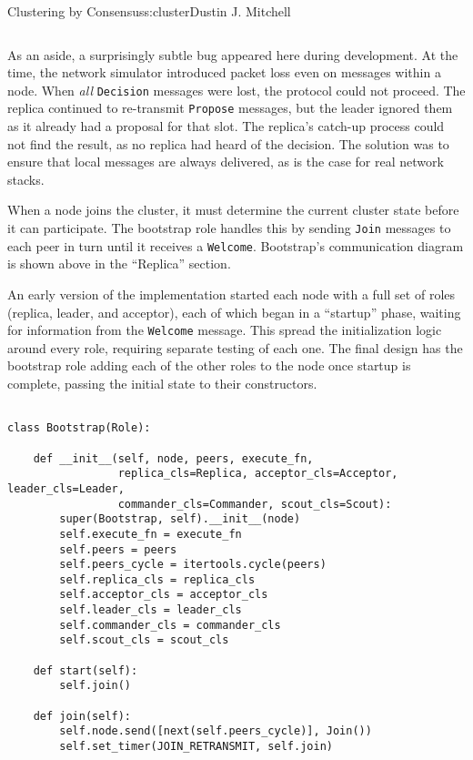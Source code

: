\begin{aosachapter}{Clustering by Consensus}{s:cluster}{Dustin J. Mitchell}
\begin{verbatim}
\end{verbatim}

As an aside, a surprisingly subtle bug appeared here during development.
At the time, the network simulator introduced packet loss even on
messages within a node. When \emph{all} \texttt{Decision} messages were
lost, the protocol could not proceed. The replica continued to
re-transmit \texttt{Propose} messages, but the leader ignored them as it
already had a proposal for that slot. The replica's catch-up process
could not find the result, as no replica had heard of the decision. The
solution was to ensure that local messages are always delivered, as is
the case for real network stacks.

\label{bootstrap}

When a node joins the cluster, it must determine the current cluster
state before it can participate. The bootstrap role handles this by
sending \texttt{Join} messages to each peer in turn until it receives a
\texttt{Welcome}. Bootstrap's communication diagram is shown above in
the ``Replica'' section.

An early version of the implementation started each node with a full set
of roles (replica, leader, and acceptor), each of which began in a
``startup'' phase, waiting for information from the \texttt{Welcome}
message. This spread the initialization logic around every role,
requiring separate testing of each one. The final design has the
bootstrap role adding each of the other roles to the node once startup
is complete, passing the initial state to their constructors.

\begin{verbatim}

class Bootstrap(Role):

    def __init__(self, node, peers, execute_fn,
                 replica_cls=Replica, acceptor_cls=Acceptor, leader_cls=Leader,
                 commander_cls=Commander, scout_cls=Scout):
        super(Bootstrap, self).__init__(node)
        self.execute_fn = execute_fn
        self.peers = peers
        self.peers_cycle = itertools.cycle(peers)
        self.replica_cls = replica_cls
        self.acceptor_cls = acceptor_cls
        self.leader_cls = leader_cls
        self.commander_cls = commander_cls
        self.scout_cls = scout_cls

    def start(self):
        self.join()

    def join(self):
        self.node.send([next(self.peers_cycle)], Join())
        self.set_timer(JOIN_RETRANSMIT, self.join)


\end{verbatim}
\end{aosachapter}

